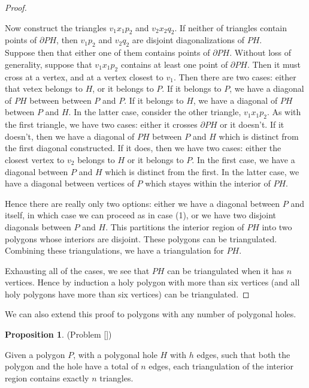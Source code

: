 \documentclass[12pt]{article}
\newcommand{\bndry}{\partial}
\theoremstyle{definition}
\newtheorem{proposition}{Proposition}
\begin{document}
\begin{proof}
\begin{enumerate}
Now construct the triangles $v_1x_1p_2$ and $v_2x_2q_2$. If neither of triangles contain points of $\bndry PH$, then $v_1p_2$ and $v_2q_2$ are disjoint diagonalizations of $PH$.\\

Suppose then that either one of them contains points of $\bndry PH$. Without loss of generality, suppose that $v_1x_1p_2$ contains at least one point of $\bndry PH$. Then it must cross at a vertex, and at a vertex closest to $v_1$. Then there are two cases: either that vetex belongs to $H$, or it belongs to $P$. If it belongs to $P$, we have a diagonal of $PH$ between between $P$ and $P$. If it belongs to $H$, we have a diagonal of $PH$ between $P$ and $H$. In the latter case, consider the other triangle, $v_1x_1p_2$. As with the first triangle, we have two cases: either it crosses $\bndry PH$ or it doesn't. If it doesn't, then we have a diagonal of $PH$ between $P$ and $H$ which is distinct from the first diagonal constructed. If it does, then we have two cases: either the closest vertex to $v_2$ belongs to $H$ or it belongs to $P$. In the first case, we have a diagonal between $P$ and $H$ which is distinct from the first. In the latter case, we have a diagonal between vertices of $P$ which stayes within the interior of $PH$. 

Hence there are really only two options: either we have a diagonal between $P$ and itself, in which case we can proceed as in case (1), or we have two disjoint diagonals between $P$ and $H$. This partitions the interior region of $PH$ into two polygons whose interiors are disjoint. These polygons can be triangulated. Combining these triangulations, we have a triangulation for $PH$. 

\end{enumerate}

Exhausting all of the cases, we see that $PH$ can be triangulated when it has $n$ vertices. Hence by induction a holy polygon with more than six vertices (and all holy polygons have more than six vertices) can be triangulated. 
\end{proof}

We can also extend this proof to polygons with any number of polygonal holes.

\begin{proposition} (Problem [])

Given a polygon $P$, with a polygonal hole $H$ with $h$ edges, such that both the polygon and the hole have a total of $n$ edges, each triangulation of the interior region contains exactly $n$ triangles. 

\end{proposition}
\end{document}

